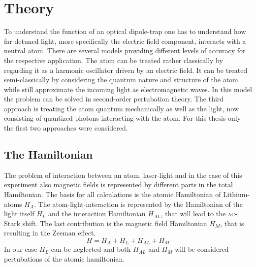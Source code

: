 \chapter{Theory}

To understand the function of an optical dipole-trap one has to understand how far detuned light, more specifically the electric field component, interacts with a neutral atom. There are several models providing different levels of accuracy for the respective application. The atom can be treated rather classically by regarding it as a harmonic oscillator driven by an electric field. It can be treated semi-classically by considering the quantum nature and structure of the atom while still approximate the incoming light as electromagnetic waves. In this model the problem can be solved in second-order pertubation theory. The third approach is treating the atom quantum mechanically as well as the light, now consisting of quantized photons interacting with the atom. For this thesis only the first two approaches were considered. 

\section{The Hamiltonian}

The problem of interaction between an atom, laser-light and in the case of this experiment also magnetic fields is represented by different parts in the total Hamiltonian. The basis for all calculations is the atomic Hamiltonian of Lithium-atoms $H_A$. The atom-light-interaction is represented by the Hamiltonian of the light itself $H_L$ and the interaction Hamiltonian $H_{AL}$, that will lead to the \textsc{ac}-Stark shift. The last contribution is the magnetic field Hamiltonian $H_M$, that is resulting in the Zeeman effect. 
\begin{equation}
H=H_A+H_L+H_{AL}+H_{M}
\label{Hamiltonian}
\end{equation}
In our case $H_L$ can be neglected and both $H_{AL}$ and $H_M$ will be considered pertubations of the atomic hamiltonian.

